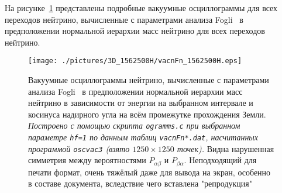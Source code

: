 На рисунке~\ref{vacn3DFn} представлены подробные вакуумные осциллограммы для всех переходов нейтрино, вычисленные с параметрами анализа Fogli~\cite{Fogli:2012ua} в предположении нормальной иерархии масс нейтрино для всех переходов нейтрино.
\clearpage
\begin{figure}[!ht]
\begin{comment}
\texttt{[image: ./pictures/3D\_1562500H/vacnFn\_ee.eps]}
\texttt{[image: ./pictures/3D\_1562500H/vacnFn\_em.eps]}
\texttt{[image: ./pictures/3D\_1562500H/vacnFn\_et.eps]}
\texttt{[image: ./pictures/3D\_1562500H/vacnFn\_me.eps]}
\texttt{[image: ./pictures/3D\_1562500H/vacnFn\_mm.eps]}
\texttt{[image: ./pictures/3D\_1562500H/vacnFn\_mt.eps]}
\texttt{[image: ./pictures/3D\_1562500H/vacnFn\_te.eps]}
\texttt{[image: ./pictures/3D\_1562500H/vacnFn\_tm.eps]}
\texttt{[image: ./pictures/3D\_1562500H/vacnFn\_tt.eps]}
\end{comment}
\texttt{[image: ./pictures/3D\_1562500H/vacnFn\_1562500H.eps]}
\caption{Вакуумные осциллограммы нейтрино, вычисленные с параметрами анализа Fogli~\cite{Fogli:2012ua} в предположении нормальной иерархии масс нейтрино в зависимости от энергии на выбранном интервале и косинуса надирного угла на всём промежутке прохождения Земли. \textit{Построено с помощью скрипта \texttt{ogramms.c} при выбранном параметре \texttt{hf=1} по данным таблиц \texttt{vacnFn*.dat}, насчитанных программой \texttt{oscvac3} (взято $1250\times1250$ точек).} Видна нарушенная симметрия между вероятностями $P_{\alpha\beta}$ и $P_{\beta\alpha}$. {\color{magenta}Неподходящий для печати формат, очень тяжёлый даже для вывода на экран, особенно в составе документа, {\color{red}вследствие чего вставлена "репродукция"{}}}}
\label{vacn3DFn}
\end{figure}

